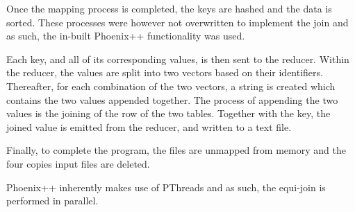 \documentclass[11pt,twocolumn]{witseiepaper}
\begin{document}
Once the mapping process is completed, the keys are hashed and the data is sorted. These processes were however not overwritten to implement the join and as such, the in-built Phoenix++ functionality was used.

Each key, and all of its corresponding values, is then sent to the reducer. Within the reducer, the values are split into two vectors based on their identifiers. Thereafter, for each combination of the two vectors, a string is created which contains the two values appended together. The process of appending the two values is the joining of the row of the two tables. Together with the key, the joined value is emitted from the reducer, and written to a text file.

Finally, to complete the program, the files are unmapped from memory and the four copies input files are deleted.

Phoenix++ inherently makes use of PThreads and as such, the equi-join is performed in parallel.
\end{document}
